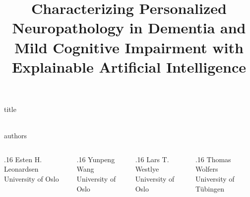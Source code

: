 \documentclass[final, 14pt]{beamer}
\title{Characterizing Personalized Neuropathology in Dementia and\\[0.5cm]Mild Cognitive Impairment with Explainable Artificial Intelligence}
\def\verticalspace{0.61cm}
\begin{document}
\begin{frame}[t]
    \thispagestyle{empty}

\begin{beamercolorbox}[sep=0em,wd=\textwidth]{title}
    \centering\\[2.75cm]
    \fontsize{48}{48}{\textbf{\inserttitle}}\\[3.25cm]

\end{beamercolorbox}

\begin{beamercolorbox}[sep=0em, wd=\textwidth]{authors}
    \def\authorwidth{.16\textwidth}
    \begin{columns}[T]
        \begin{column}{\authorwidth}
            \centering
            Esten H. Leonardsen\\
            University of Oslo\\
            \vspace{1em}
        \end{column}
        \begin{column}{\authorwidth}
            \centering
            Yunpeng Wang\\
            University of Oslo
        \end{column}
        \begin{column}{\authorwidth}
            \centering
            Lars T. Westlye\\
            University of Oslo
        \end{column}
        \begin{column}{\authorwidth}
            \centering
            Thomas Wolfers\\
            University of Tübingen
        \end{column}
    \end{columns}
\end{beamercolorbox}

\vspace{\verticalspace}


\end{frame}
\end{document}
